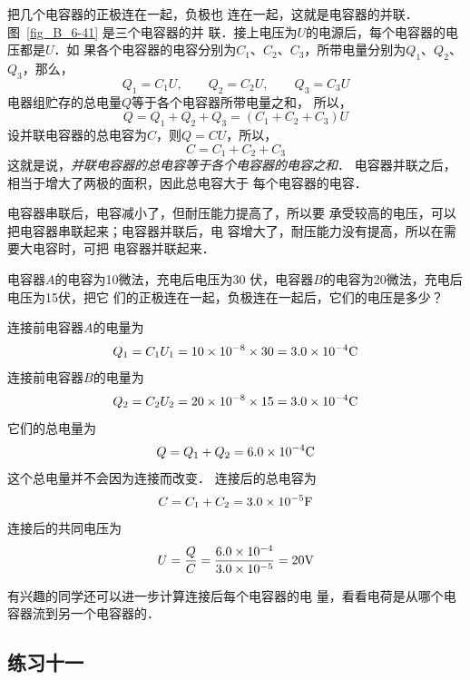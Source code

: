 把几个电容器的正极连在一起，负极也
连在一起，这就是电容器的并联．图~\ref{fig_B_6-41} 是三个电容器的并
联．接上电压为$U$的电源后，每个电容器的电压都是$U$．如
果各个电容器的电容分别为$C_1$、$C_2$、$C_3$，所带电量分别为$Q_1$、$Q_2$、$Q_3$，那么，
\[Q_1=C_1U,\qquad Q_2=C_2U,\qquad Q_3=C_3U\]
电器组贮存的总电量$Q$等于各个电容器所带电量之和，
所以，
\[Q=Q_1+Q_2+Q_3=(C_1+C_2+C_3)U\]
设并联电容器的总电容为$C$，则$Q=CU$，所以，
\[C=C_1+C_2+C_3\]
这就是说，\textit{并联电容器的总电容等于各个电容器的电容之和}．
电容器并联之后，相当于增大了两极的面积，因此总电容大于
每个电容器的电容．

电容器串联后，电容减小了，但耐压能力提高了，所以要
承受较高的电压，可以把电容器串联起来；电容器并联后，电
容增大了，耐压能力没有提高，所以在需要大电容时，可把
电容器并联起来．

\begin{example}
电容器$A$的电容为10微法，充电后电压为30
伏，电容器$B$的电容为20微法，充电后电压为15伏，把它
们的正极连在一起，负极连在一起后，它们的电压是多少？
\end{example}


\begin{solution}
连接前电容器$A$的电量为
\[Q_1=C_1U_1=10\times10^{-8}\times30=3.0\times10^{-4}{\rm C}\]
连接前电容器$B$的电量为
\[Q_2=C_2U_2=20\times10^{-8}\times 15=3.0\times10^{-4}{\rm C}\]
它们的总电量为
\[Q=Q_1+Q_2=6.0\times10^{-4}{\rm C}\]
这个总电量并不会因为连接而改变．
连接后的总电容为
\[C=C_1+C_2=3.0\times10^{-5}{\rm F}\]
连接后的共同电压为
\[U=\frac{Q}{C}=\frac{6.0\times10^{-4}}{3.0\times10^{-5}}=20{\rm V} \]
\end{solution}

有兴趣的同学还可以进一步计算连接后每个电容器的电
量，看看电荷是从哪个电容器流到另一个电容器的．

\subsection*{练习十一}


